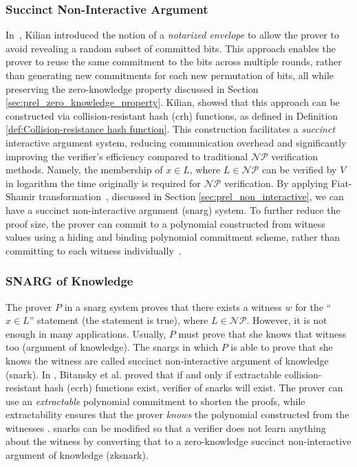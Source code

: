 \subsubsection{Succinct Non-Interactive Argument}
In~\cite{Kilian1992}, Kilian introduced the notion of a \textit{notarized envelope} to allow the prover to avoid revealing a random subset of committed bits. This approach enables the prover to reuse the same commitment to the bits across multiple rounds, rather than generating new commitments for each new permutation of bits, all while preserving the zero-knowledge property discussed in Section \ref{sec:prel_zero_knowledge_property}. Kilian, showed that this approach can be constructed via  collision-resistant hash (\gls{crh}) functions, as defined in Definition \ref{def:Collision-resistance hash function}. This construction facilitates a \textit{succinct} interactive argument system, reducing communication overhead and significantly improving the verifier's efficiency compared to traditional $\mathcal{NP}$ verification methods. Namely, the membership of $x \in L$, where $L \in \mathcal{NP}$ can be verified by $V$ in logarithm the time originally is required for  $\mathcal{NP}$ verification. By applying Fiat-Shamir transformation~\cite{Fiat1987}, discussed in Section \ref{sec:prel_non_interactive},  we can have a succinct non-interactive argument (\gls{snarg}) system. To further reduce the proof size, the prover can commit to a polynomial constructed from witness values using a hiding and binding polynomial commitment scheme, rather than committing to each witness individually~\cite{Thaler2022Proofs}.

\subsubsection{SNARG of Knowledge} 
The prover $P$ in a \gls{snarg} system proves that there exists a witness $w$ for the  ``$x \in L$''  statement (the statement is true), where $L\in \mathcal{NP}$. However, it is not enough in many applications. Usually, $P$ must prove that she knows that witness too (argument of knowledge).  The \gls{snarg}s in which $P$ is able to prove that she knows the witness are called succinct non-interactive argument of knowledge (\gls{snark}). In \cite{Bitansky2012}, Bitansky et al. proved that if and only if  extractable collision-resistant hash (\gls{ecrh}) functions exist, verifier of \gls{snark}s will exist.  The prover can use an \textit{extractable} polynomial commitment to shorten the proofs, while extractability ensures that the prover \textit{knows} the polynomial constructed from the witnesses \cite{Thaler2022Proofs}. \gls{snark}s can be modified so that a verifier does not learn anything about the witness by converting that to a zero-knowledge succinct non-interactive argument of knowledge (\gls{zksnark}).  

